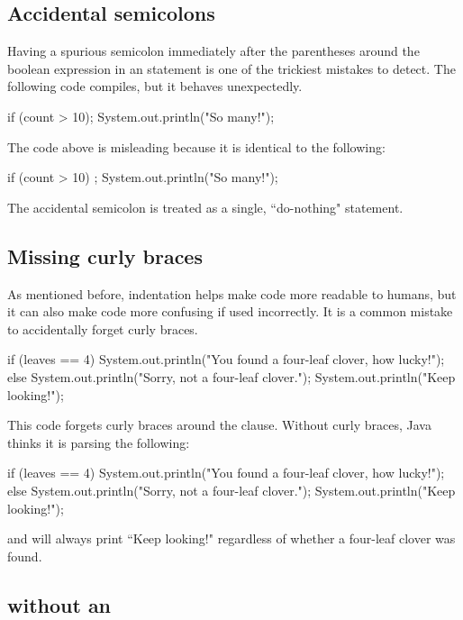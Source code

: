 \subsection{Accidental semicolons}
Having a spurious semicolon immediately after the parentheses around the boolean expression in an  statement is one of the trickiest mistakes to detect. The following code compiles, but it behaves unexpectedly. 
\begin{code}
if (count > 10);
{
    System.out.println("So many!");
}
\end{code}

\noindent The code above is misleading because it is identical to the following:
\begin{code}
if (count > 10) 
{
    ;
}
System.out.println("So many!");
\end{code}

\noindent The accidental semicolon is treated as a single, ``do-nothing" statement.

\subsection{Missing curly braces}
As mentioned before, indentation helps make code more readable to humans, but it can also make code more confusing if used incorrectly. It is a common mistake to accidentally forget curly braces.

\begin{code}
if (leaves == 4) 
{
    System.out.println("You found a four-leaf clover, how lucky!");
} 
else
    System.out.println("Sorry, not a four-leaf clover.");
    System.out.println("Keep looking!");
\end{code}

\noindent This code forgets curly braces around the  clause. Without curly braces, Java thinks it is parsing the following:

\begin{code}
if (leaves == 4) 
{
    System.out.println("You found a four-leaf clover, how lucky!");
} 
else
{
    System.out.println("Sorry, not a four-leaf clover.");
}
System.out.println("Keep looking!");
\end{code}

and will always print ``Keep looking!" regardless of whether a four-leaf clover was found. 

\subsection{ without an }

